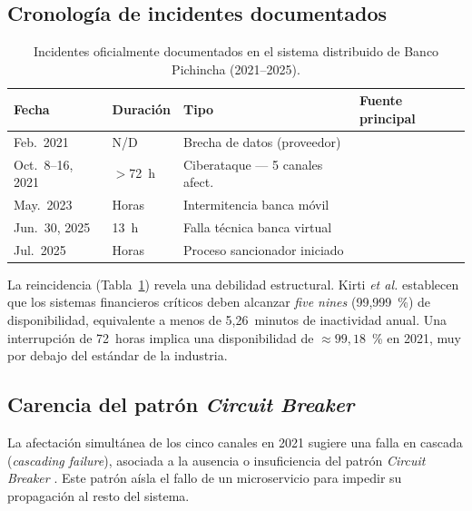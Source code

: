 \documentclass[12pt,a4paper]{article}
\begin{document}
\subsection{Cronolog\'ia de incidentes documentados}

\begin{table}[ht]
\centering
\caption{Incidentes oficialmente documentados en el sistema distribuido de Banco Pichincha (2021--2025).}
\label{tab:incidentes}
\begin{tabularx}{\textwidth}{lllX}
\toprule
\textbf{Fecha} & \textbf{Duraci\'on} & \textbf{Tipo} & \textbf{Fuente principal} \\
\midrule
Feb.\ 2021        & N/D     & Brecha de datos (proveedor)      & \cite{DaremCyberThreats2023} \\
Oct.\ 8--16, 2021 & $>$72~h & Ciberataque --- 5 canales afect. & \cite{SuperbancosIncidente2021} \\
May.\ 2023        & Horas   & Intermitencia banca m\'ovil      & \cite{EcuadorChequea2023} \\
Jun.\ 30, 2025    & 13~h    & Falla t\'ecnica banca virtual    & \cite{Ecuavisa2025} \\
Jul.\ 2025        & Horas   & Proceso sancionador iniciado     & \cite{SuperbancosSancion2025} \\
\bottomrule
\end{tabularx}
\end{table}

La reincidencia (Tabla~\ref{tab:incidentes}) revela una debilidad estructural. Kirti \textit{et al.} \cite{KirtiFaultTolerance2024} establecen que los sistemas financieros cr\'iticos deben alcanzar \textit{five nines} (99,999~\%) de disponibilidad, equivalente a menos de 5,26~minutos de inactividad anual. Una interrupci\'on de 72~horas implica una disponibilidad de $\approx99{,}18$~\% en 2021, muy por debajo del est\'andar de la industria.

\subsection{Carencia del patr\'on \textit{Circuit Breaker}}

La afectaci\'on simult\'anea de los cinco canales en 2021 sugiere una falla en cascada (\textit{cascading failure}), asociada a la ausencia o insuficiencia del patr\'on \textit{Circuit Breaker} \cite{DesignPatterns2024}. Este patr\'on a\'isla el fallo de un microservicio para impedir su propagaci\'on al resto del sistema.
\end{document}
